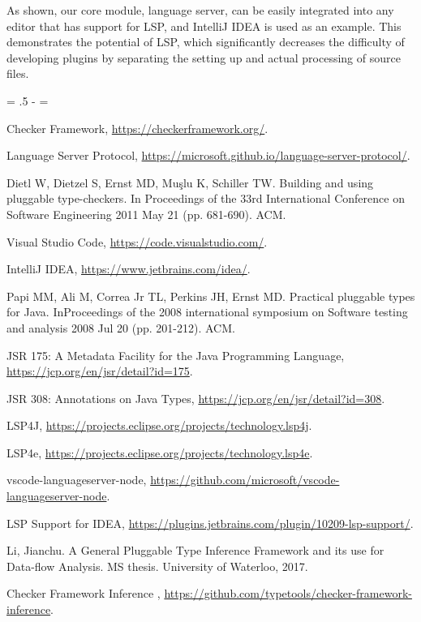 \documentclass{article}
\newcommand{\ls}[1]
    {\dimen0=\fontdimen6\the\font\lineskip=#1\dimen0
     \advance\lineskip.5\fontdimen5\the\font
     \advance\lineskip-\dimen0
     \lineskiplimit=0.9\lineskip
     \baselineskip=\lineskip
     \advance\baselineskip\dimen0
     \normallineskip\lineskip\normallineskiplimit\lineskiplimit
     \normalbaselineskip\baselineskip
     \ignorespaces}
\begin{document}
As shown, our core module, language server, can be easily integrated into any editor that has support for LSP, and IntelliJ IDEA is used as an example. This demonstrates the potential of LSP, which significantly decreases the difficulty of developing plugins by separating the setting up and actual processing of source files.



\ls{1.0}
\begin{thebibliography}{1}

 Checker Framework, \url{https://checkerframework.org/}.

 Language Server Protocol, \url{https://microsoft.github.io/language-server-protocol/}.

 Dietl W, Dietzel S, Ernst MD, Muşlu K, Schiller TW. Building and using pluggable type-checkers. In Proceedings of the 33rd International Conference on Software Engineering 2011 May 21 (pp. 681-690). ACM.

 Visual Studio Code, \url{https://code.visualstudio.com/}.

 IntelliJ IDEA, \url{https://www.jetbrains.com/idea/}.

 Papi MM, Ali M, Correa Jr TL, Perkins JH, Ernst MD. Practical pluggable types for Java. InProceedings of the 2008 international symposium on Software testing and analysis 2008 Jul 20 (pp. 201-212). ACM.

 JSR 175: A Metadata Facility for the Java Programming Language, \url{https://jcp.org/en/jsr/detail?id=175}.

 JSR 308: Annotations on Java Types, \url{https://jcp.org/en/jsr/detail?id=308}.

 LSP4J, \url{https://projects.eclipse.org/projects/technology.lsp4j}.

 LSP4e, \url{https://projects.eclipse.org/projects/technology.lsp4e}.

 vscode-languageserver-node, \url{https://github.com/microsoft/vscode-languageserver-node}.

 LSP Support for IDEA, \url{https://plugins.jetbrains.com/plugin/10209-lsp-support/}.

 Li, Jianchu. A General Pluggable Type Inference Framework and its use for Data-flow Analysis. MS thesis. University of Waterloo, 2017.

 Checker Framework Inference
, \url{https://github.com/typetools/checker-framework-inference}.

\end{thebibliography}
\end{document}
